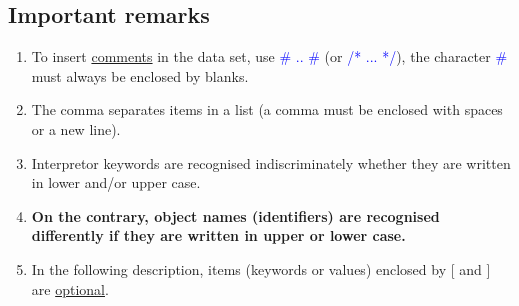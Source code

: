 






\subsection{Important remarks}
\begin{enumerate}
\item To insert \underline{comments} in the data set, use \textcolor{blue}{\# .. \#} (or \textcolor{blue}{/* ... */}), the character \textcolor{blue}{\#} must always be enclosed by blanks.
\item The comma separates items in a list (a comma must be enclosed with spaces or a new line).
\item Interpretor keywords are recognised indiscriminately whether they are written in lower and/or upper case.
\item \textbf{On the contrary, object names (identifiers) are recognised differently if they are written in upper or lower case.}
\item In the following description, items (keywords or values) enclosed by [ and ] are \underline{optional}.
\end{enumerate}



